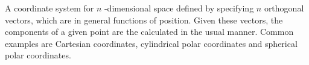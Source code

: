 A coordinate system for  $ n $ -dimensional space
defined
by specifying  $ n $  orthogonal vectors, which are in general
functions of position. Given these vectors, the components of a given
point are the calculated in the usual manner. Common examples are
Cartesian coordinates, cylindrical polar coordinates and
spherical polar coordinates.
